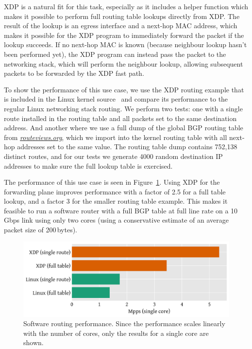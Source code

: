 \documentclass[10pt,sigconf,anonymous]{acmart}
\begin{document}
XDP is a natural fit for this task, especially as it includes a helper function
which makes it possible to perform full routing table lookups directly from XDP.
The result of the lookup is an egress interface and a next-hop MAC address,
which makes it possible for the XDP program to immediately forward the packet if
the lookup succeeds. If no next-hop MAC is known (because neighbour lookup
hasn't been performed yet), the XDP program can instead pass the packet to the
networking stack, which will perform the neighbour lookup, allowing subsequent
packets to be forwarded by the XDP fast path.

To show the performance of this use case, we use the XDP routing example that is
included in the Linux kernel source~\cite{fwd-example} and compare its
performance to the regular Linux networking stack routing. We perform two tests:
one with a single route installed in the routing table and all packets set to
the same destination address. And another where we use a full dump of the global
BGP routing table from \emph{\url{routeviews.org}}, which we import into the
kernel routing table with all next-hop addresses set to the same value. The
routing table dump contains 752,138 distinct routes, and for our tests we
generate 4000 random destination IP addresses to make sure the full lookup table
is exercised.

The performance of this use case is seen in Figure~\ref{fig:router-fwd}. Using
XDP for the forwarding plane improves performance with a factor of 2.5 for a
full table lookup, and a factor 3 for the smaller routing table example. This
makes it feasible to run a software router with a full BGP table at full line
rate on a 10\,Gbps link using only two cores (using a conservative estimate of
an average packet size of 200\,bytes).

\begin{figure}[t]
\centering
\includegraphics[width=\linewidth]{figures/router-fwd.pdf}
\caption{\label{fig:router-fwd} Software routing performance. Since the
  performance scales linearly with the number of cores, only the results for a
  single core are shown.}
\end{figure}
\end{document}
